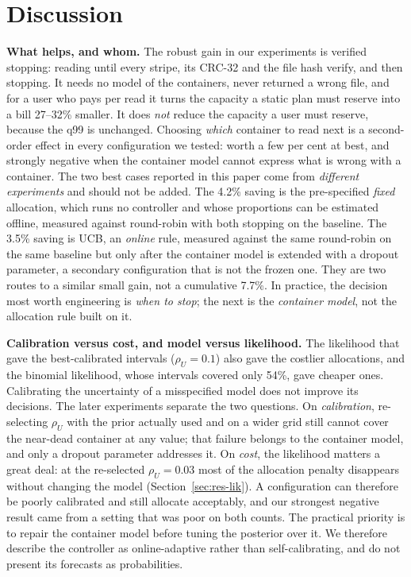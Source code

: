 \documentclass[conference,onecolumn,11pt]{IEEEtran}
\begin{document}
\section{Discussion}\label{sec:disc}
\textbf{What helps, and whom.}  The robust gain in our experiments is verified stopping: reading until
every stripe, its CRC-32 and the file hash verify, and then stopping.  It needs no model of the
containers, never returned a wrong file, and for a user who pays per read it turns the capacity a static
plan must reserve into a bill 27--32\% smaller.  It does \emph{not} reduce the capacity a user must
reserve, because the q99 is unchanged.  Choosing \emph{which} container to read next is a second-order
effect in every configuration we tested: worth a few per cent at best, and strongly negative when the
container model cannot express what is wrong with a container.  The two best cases reported in this
paper come from \emph{different experiments} and should not be added.  The 4.2\% saving is the
pre-specified \emph{fixed} allocation, which runs no controller and whose proportions can be estimated
offline, measured against round-robin with both stopping on the baseline.  The 3.5\% saving is UCB, an
\emph{online} rule, measured against the same round-robin on the same baseline but only after the
container model is extended with a dropout parameter, a secondary configuration that is not the frozen
one.  They are two routes to a similar small gain, not a cumulative 7.7\%.  In practice, the decision
most worth engineering is \emph{when to stop}; the next is the \emph{container model}, not the
allocation rule built on it.

\textbf{Calibration versus cost, and model versus likelihood.}  The likelihood that gave the
best-calibrated intervals ($\rho_U{=}0.1$) also gave the costlier allocations, and the binomial
likelihood, whose intervals covered only 54\%, gave cheaper ones.  Calibrating the uncertainty of a
misspecified model does not improve its decisions.  The later experiments separate the two questions.
On \emph{calibration}, re-selecting $\rho_U$ with the prior actually used and on a wider grid still
cannot cover the near-dead container at any value; that failure belongs to the container model, and
only a dropout parameter addresses it.  On \emph{cost}, the likelihood matters a great deal: at the
re-selected $\rho_U{=}0.03$ most of the allocation penalty disappears without changing the model
(Section~\ref{sec:res-lik}).  A configuration can therefore be poorly calibrated and still allocate
acceptably, and our strongest negative result came from a setting that was poor on both counts.  The
practical priority is to repair the container model before tuning the posterior over it.  We therefore
describe the controller as online-adaptive rather than self-calibrating, and do not present its
forecasts as probabilities.
\end{document}
